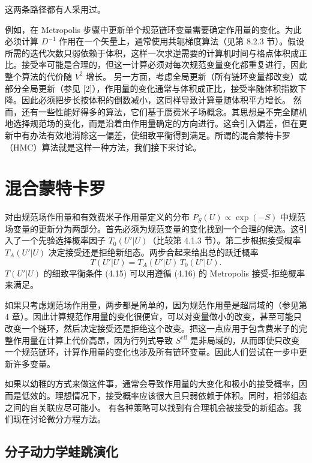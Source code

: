 这两条路径都有人采用过。

例如，在 Metropolis 步骤中更新单个规范链环变量需要确定作用量的变化。为此必须计算 $D^{-1}$ 作用在一个矢量上，通常使用共轭梯度算法（见第 8.2.3 节）。假设所需的迭代次数只弱依赖于体积，这样一次求逆需要的计算机时间与格点体积成正比。接受率可能是合理的，但这一计算必须对每次规范变量变化都重复进行，因此整个算法的代价随 $V^2$ 增长。
另一方面，考虑全局更新（所有链环变量都改变）或部分全局更新（参见 [2]），作用量的变化通常与体积成正比，接受率随体积指数下降。因此必须把步长按体积的倒数减小，这同样导致计算量随体积平方增长。
然而，还有一些性能好得多的算法，它们基于赝费米子场概念。其思想是不完全随机地选择规范场的变化，而是沿着由作用量确定的方向进行。这会引入偏差，但在更新中有办法有效地消除这一偏差，使细致平衡得到满足。所谓的混合蒙特卡罗（HMC）算法就是这样一种方法，我们接下来讨论。

\section{混合蒙特卡罗}

对由规范场作用量和有效费米子作用量定义的分布 $P_S(U) \propto \exp(-S)$ 中规范场变量的更新分为两部分。首先必须为规范变量的变化找到一个合理的候选。这引入了一个先验选择概率因子 $T_0(U'|U)$（比较第 4.1.3 节）。第二步根据接受概率 $T_A(U'|U)$ 决定接受还是拒绝新组态。两步合起来给出总的跃迁概率
\begin{equation}
T(U'|U) = T_A(U'|U)\,T_0(U'|U).
\end{equation}
$T(U'|U)$ 的细致平衡条件 (4.15) 可以用遵循 (4.16) 的 Metropolis 接受-拒绝概率来满足。

如果只考虑规范场作用量，两步都是简单的，因为规范作用量是超局域的（参见第 4 章）。因此计算规范作用量的变化很便宜，可以对变量做小的改变，甚至可能只改变一个链环，然后决定接受还是拒绝这个改变。把这一点应用于包含费米子的完整作用量在计算上代价高昂，因为行列式导致 $S^{\mathrm{eff}}$ 是非局域的，从而即使只改变一个规范链环，计算作用量的变化也涉及所有链环变量。因此人们尝试在一步中更新许多变量。

如果以幼稚的方式来做这件事，通常会导致作用量的大变化和极小的接受概率，因而是低效的。理想情况下，接受概率应该很大且只弱依赖于体积。同时，相邻组态之间的自关联应尽可能小。
有各种策略可以找到有合理机会被接受的新组态。我们现在讨论微分方程方法。

\subsection{分子动力学蛙跳演化}


